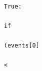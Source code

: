 \documentclass[10pt,a4paper]{article} %
\begin{document}
\begin{lstlisting}
                                                                                                                                                                                                                                                                                                                                                                                                                                                                                                                                                                                                                                                                                                                                                                                                                                                    True:
                                                                                                                                                                                                                                                                                                                                                                                                                                                                                                                                                                                                                                                                                                                                                                                                                                                            if
                                                                                                                                                                                                                                                                                                                                                                                                                                                                                                                                                                                                                                                                                                                                                                                                                                                                (events[0]
                                                                                                                                                                                                                                                                                                                                                                                                                                                                                                                                                                                                                                                                                                                                                                                                                                                                <

\end{lstlisting}
\end{document}
